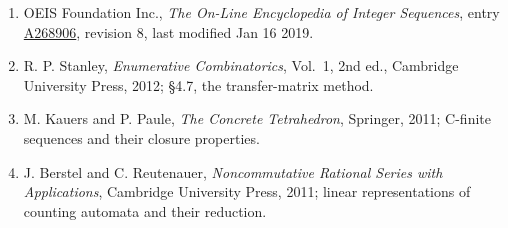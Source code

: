 \documentclass[11pt]{article}
\theoremstyle{definition}
\begin{document}
\begin{enumerate}

\item OEIS Foundation Inc., \emph{The On-Line Encyclopedia of Integer Sequences}, entry \href{https://oeis.org/A268906}{A268906}, revision 8, last modified Jan 16 2019.

\item R. P. Stanley, \emph{Enumerative Combinatorics}, Vol.~1, 2nd ed., Cambridge University Press, 2012; \S4.7, the transfer-matrix method.

\item M. Kauers and P. Paule, \emph{The Concrete Tetrahedron}, Springer, 2011; C-finite sequences and their closure properties.

\item J. Berstel and C. Reutenauer, \emph{Noncommutative Rational Series with Applications}, Cambridge University Press, 2011; linear representations of counting automata and their reduction.

\end{enumerate}
\end{document}
